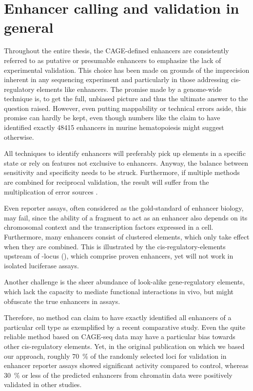 
\section{Enhancer calling and validation in general}
\label{chap:d:enhancers:mechanism:validate}

Throughout the entire thesis, the CAGE-defined enhancers are consistently referred to as putative or presumable enhancers to emphasize the lack of experimental validation. This choice has been made on grounds of the imprecision inherent in any sequencing experiment and particularly in those addressing cis-regulatory elements like enhancers. The promise made by a genome-wide technique is, to get the full, unbiased picture and thus the ultimate answer to the question raised. However, even putting mappability or technical errors aside, this promise can hardly be kept, even though numbers like the claim to have identified exactly \num{48415} enhancers in murine hematopoiesis\cite{Lara-Astiaso2014} might suggest otherwise. 

All techniques  to identify enhancers will preferably pick up elements in a specific state  or rely on features not exclusive to enhancers. Anyway, the balance between sensitivity and specificity needs to be struck. Furthermore, if multiple methods are combined for reciprocal validation, the result will suffer from the multiplication of error sources . 

Even reporter assays, often considered as the gold-standard of enhancer biology, may fail, since the ability of a fragment to act as an enhancer also depends on its chromosomal context and the transcription factors expressed in a cell. Furthermore, many enhancers consist of clustered elements, which only take effect when they are combined. This is illustrated by the cis-regulatory-elements upstream of -locus (), which comprise proven enhancers, yet will not work in isolated luciferase assays. 

Another challenge is the sheer abundance of look-alike gene-regulatory elements, which lack the capacity to mediate functional interactions in vivo, but might obfuscate the true enhancers in assays. 

Therefore, no method can claim to have exactly identified all enhancers of a particular cell type as exemplified by a recent comparative study\cite{Benton2019}. Even the quite reliable method based on CAGE-seq data may have a particular bias towards other cis-regulatory elements\cite{Young2017}. Yet, in the original publication on which we based our approach, roughly \SI{70}{\percent} of the randomly selected loci for validation in enhancer reporter assays showed significant activity compared to control\cite{Andersson2014}, whereas \SI{30}{\percent} or less of the predicted enhancers from chromatin data were positively validated in other studies\cite{Kheradpour2013,Kwasnieski2014}. 

